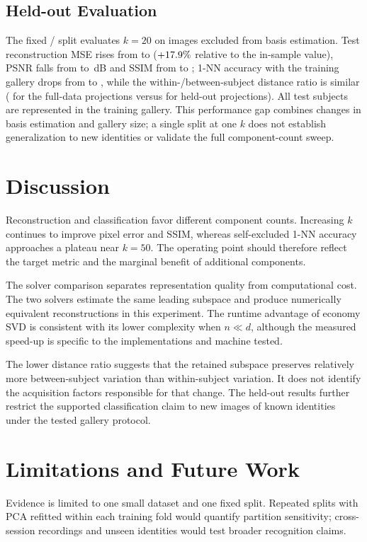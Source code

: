 \documentclass[journal]{IEEEtran}
\begin{document}
\subsection{Held-out Evaluation}
\label{sec:heldout}
The fixed \nTrainN/\nTestN{} split evaluates $k=20$ on images excluded
from basis estimation. Test reconstruction MSE rises from \nMSEK{}
to \nTestMSE{} ($+17.9\%$ relative to the in-sample value), PSNR falls
from \nPSNRK{} to \nTestPSNR{}\,dB and SSIM from \nSsimK{} to \nTestSSIM{};
1-NN accuracy with the training gallery drops from \nAccK{} to \nTestAcc{},
while the within-/between-subject distance ratio is similar
(\nSepPCA{} for the full-data projections versus \nTestSep{} for held-out
projections). All test subjects are represented in the training gallery.
This performance gap combines changes in basis estimation and gallery
size; a single split at one $k$ does not establish generalization to new
identities or validate the full component-count sweep.

\section{Discussion}
Reconstruction and classification favor different component counts.
Increasing $k$ continues to
improve pixel error and SSIM, whereas self-excluded 1-NN accuracy approaches
a plateau near $k=50$. The operating point should therefore reflect the
target metric and the marginal benefit of additional components.

The solver comparison separates representation quality from computational
cost. The two solvers estimate the same leading subspace and produce
numerically equivalent reconstructions in this experiment. The runtime
advantage of economy SVD is consistent with its lower complexity when
$n\ll d$, although the measured speed-up is specific to the implementations
and machine tested.

The lower distance ratio suggests that the retained subspace preserves
relatively more between-subject variation than within-subject variation.
It does not identify the acquisition factors responsible for that change.
The held-out results further restrict the supported classification claim
to new images of known identities under the tested gallery protocol.

\section{Limitations and Future Work}
\label{sec:limits}
Evidence is limited to one small dataset and one fixed split. Repeated
splits with PCA refitted within each training fold would quantify partition
sensitivity; cross-session recordings and unseen identities would test
broader recognition claims.
\end{document}
